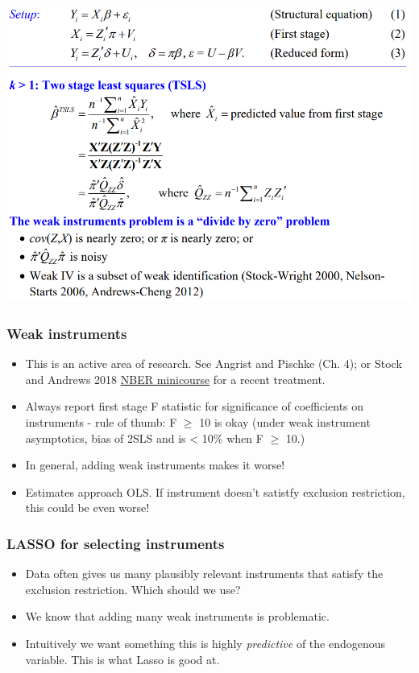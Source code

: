 \begin{frame}{}
  \begin{center}
    \includegraphics[width=1\textwidth]{./resources/StockNBER2sls}
  \end{center}  
\end{frame}


\begin{frame}
  \frametitle{Weak instruments}
  \begin{itemize}
    \item This is an active area of research. See Angrist and Pischke (Ch. 4); or Stock and Andrews 2018 \href{https://www.nber.org/econometrics_minicourse_2018/}{NBER minicourse} for a recent treatment. 
    \item Always report first stage F statistic for significance of
    coefficients on instruments - rule of thumb: F $\ge$ 10 is
    okay (under weak instrument asymptotics, bias
    of 2SLS and is < 10\% when F $\ge$ 10.)
    \item In general, adding weak instruments makes it worse! 
    \item Estimates approach OLS. If instrument doesn't satistfy exclusion restriction, this could be even worse!
   \end{itemize}
\end{frame}

\begin{frame}
  \frametitle{LASSO for selecting instruments}
  \begin{itemize}
    \item Data often gives us many plausibly relevant instruments that satisfy the exclusion restriction. Which should we use?
    \item We know that adding many weak instruments is problematic. 
    \item Intuitively we want something this is highly \textit{predictive} of the endogenous variable. This is what Lasso is good at. \citep{belloni2012sparse}
   \end{itemize}
\end{frame}

